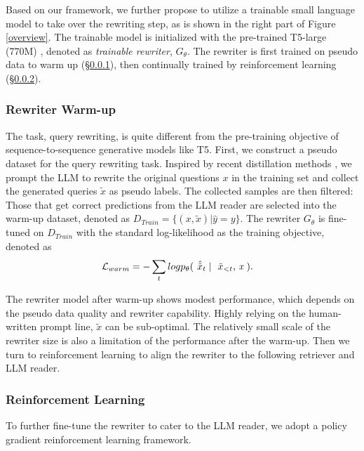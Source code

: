 Based on our framework, we further propose to utilize a trainable small language model to take over the rewriting step, as is shown in the right part of Figure \ref{overview}. 
The trainable model is initialized with the pre-trained T5-large (770M) \cite{2020t5}, denoted as \textit{trainable rewriter}, $G_{\theta}$.
The rewriter is first trained on pseudo data to warm up (\S \ref{warmup}), then continually trained by reinforcement learning (\S \ref{rein}).

\subsubsection{Rewriter Warm-up}\label{warmup}
The task, query rewriting, is quite different from the pre-training objective of sequence-to-sequence generative models like T5.
First, we construct a pseudo dataset for the query rewriting task.
Inspired by recent distillation methods \cite{Hsieh2023DistillingSO,ho2022large}, we prompt the LLM to rewrite the original questions $x$ in the training set and collect the generated queries $\tilde{x}$ as pseudo labels. 
The collected samples are then filtered: Those that get correct predictions from the LLM reader are selected into the warm-up dataset, denoted as $D_{Train} = \{(x, \tilde{x}) | \hat{y} = y\}$. 
The rewriter $G_{\theta}$ is fine-tuned on $D_{Train}$ with the standard log-likelihood as the training objective, denoted as
\begin{equation}
\setlength{\abovedisplayskip}{5pt}
\setlength{\belowdisplayskip}{5pt}
\begin{split}
& \mathcal{L}_{warm} = - \sum_{t} logp_{\theta} \textup{(} \textit{ $\hat{\tilde{x}}$}_{t} \mid \textit{ $\tilde{x}$}_{<t} \textup{, } \textit{x} \textup{ )}.
\end{split}
\label{loss}
\end{equation}

The rewriter model after warm-up shows modest performance, which depends on the pseudo data quality and rewriter capability. 
Highly relying on the human-written prompt line, $\tilde{x}$ can be sub-optimal. 
The relatively small scale of the rewriter size is also a limitation of the performance after the warm-up.
Then we turn to reinforcement learning to align the rewriter to the following retriever and LLM reader.

\subsubsection{Reinforcement Learning}\label{rein}
To further fine-tune the rewriter to cater to the LLM reader, we adopt a policy gradient reinforcement learning framework. 

